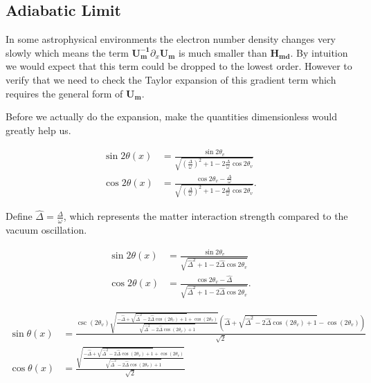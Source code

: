 \documentclass{tufte-handout}
\begin{document}
\subsection{Adiabatic Limit}



In some astrophysical environments the electron number density changes very slowly which means the term $\mathbf{U_m^{-1}} \partial_x \mathbf{U_m} $ is much smaller than $\mathbf{H_{md}}$. By intuition we would expect that this term could be dropped to the lowest order. However to verify that we need to check the Taylor expansion of this gradient term which requires the general form of $\mathbf{U_m}$.


Before we actually do the expansion, make the quantities dimensionless would greatly help us.

\begin{align*}
\sin 2\theta(x)  &= \frac{\sin 2\theta_v}{\sqrt{ \left(\frac{\Delta}{\omega} \right)^2+1 - 2 \frac{\Delta}{\omega}\cos 2\theta_v }} \\
\cos 2\theta(x)&= \frac{ \cos 2\theta_v - \frac{\Delta}{\omega} }{ \sqrt{ \left( \frac{\Delta}{\omega} \right)^2  +1 - 2 \frac{\Delta}{\omega}\cos 2\theta_v  }}.
\end{align*}

Define $\hat\Delta = \frac{\Delta}{\omega}$, which represents the matter interaction strength compared to the vacuum oscillation.

\begin{align*}
\sin 2\theta(x)  &= \frac{\sin 2\theta_v}{\sqrt{ \hat\Delta ^2+1 - 2 \hat\Delta \cos 2\theta_v }} \\
\cos 2\theta(x)&= \frac{ \cos 2\theta_v - \hat\Delta  }{ \sqrt{\hat\Delta ^2  +1 - 2 \hat\Delta \cos 2\theta_v } }.
\end{align*}



\begin{align*}
\sin\theta(x) & = \frac{\csc \left(2 \theta _v\right) \sqrt{\frac{-\hat{\Delta }+\sqrt{\hat{\Delta }^2-2 \hat{\Delta } \cos \left(2 \theta _v\right)+1}+\cos \left(2 \theta _v\right)}{\sqrt{\hat{\Delta }^2-2 \hat{\Delta } \cos \left(2 \theta _v\right)+1}}} \left(\hat{\Delta }+\sqrt{\hat{\Delta }^2-2 \hat{\Delta } \cos \left(2 \theta _v\right)+1}-\cos \left(2 \theta _v\right)\right)}{\sqrt{2}} \\
\cos\theta(x)& = \frac{\sqrt{\frac{-\hat{\Delta }+\sqrt{\hat{\Delta }^2-2 \hat{\Delta } \cos \left(2 \theta _v\right)+1}+\cos \left(2 \theta _v\right)}{\sqrt{\hat{\Delta }^2-2 \hat{\Delta } \cos \left(2 \theta _v\right)+1}}}}{\sqrt{2}}
\end{align*}
\end{document}
